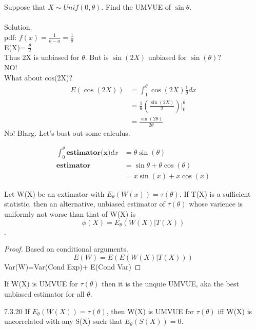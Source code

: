 \documentclass[11pt,fleqn]{book} %
\begin{document}
\begin{example} Suppose that $X \sim Unif(0,\theta)$. Find the UMVUE of $\sin\theta$.\\
\\
Solution. \\
pdf: $f(x)=\frac{1}{b-a} = \frac{1}{\theta}$\\
E(X)= $\frac{\theta}{2}$\\
Thus 2X is unbiased for $\theta$. But is $\sin(2X)$  unbiased for $\sin(\theta)$?\\
NO!\\

What about cos(2X)?
\begin{align*}
E(\cos(2X))&= \int^\theta_1 \cos(2X)\frac{1}{\theta}dx\\
	&= \frac{1}{\theta}\left(\frac{\sin(2X)}{2} \right)|^\theta_0\\
	&=\frac{\sin(2\theta)}{2\theta}
\end{align*}
No! Blarg. Let's bust out some calculus.

\begin{align*}
	\int^\theta_0 \textbf{estimator(x)} dx &= \theta \sin(\theta)\\
		\textbf{estimator} &= \sin\theta+\theta\cos(\theta)\\
			&= x\sin(x)+x\cos(x)
\end{align*}
 	
 \end{example} 

 \begin{theorem} Let W(X) be an extimator with $E_\theta(W(x))=\tau(\theta)$. If T(X) is a sufficient statistic, then an alternative, unbiased estimator of $\tau(\theta)$ whose varience is uniformly not worse than that of W(X) is
 	$$\phi(X)=E_\theta(W(X)|T(X))$$.
 \end{theorem}

 \begin{proof}
  	Based on conditional arguments. 
 $$E(W)=E(E(W(X)|T(X)))$$ Var(W)=Var(Cond Exp)+ E(Cond Var)
  \end{proof} 

 \begin{theorem}
 	If W(X) is UMVUE for $\tau(\theta)$ then it is the unquie UMVUE, aka the best unbiased estimator for all $\theta$. 
 \end{theorem}

 \begin{theorem}{7.3.20}
 	If $E_\theta(W(X))=\tau(\theta)$, then W(X) is UMVUE for $\tau(\theta)$ iff W(X) is uncorrelated with any S(X) such that $E_\theta(S(X))=0$. 
 \end{theorem}
\end{document}

